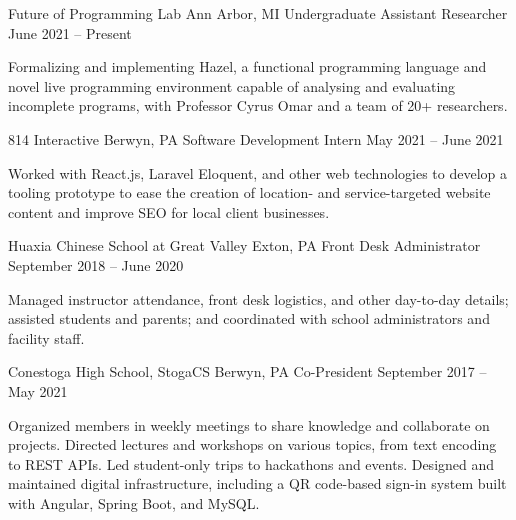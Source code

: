 \documentclass[letterpaper,11pt]{article}
\begin{document}
  \begin{rsectionlist}
    \rsectionitem
      {Future of Programming Lab}
      {Ann Arbor, MI}
      {Undergraduate Assistant Researcher}
      {June 2021 -- Present}
      
      Formalizing and implementing Hazel, a functional programming language and novel live
      programming environment capable of analysing and evaluating incomplete programs, with
      Professor Cyrus Omar and a team of 20+ researchers.

      \begin{rpointlist}
      \end{rpointlist}

    \rsectionitem
      {814 Interactive}
      {Berwyn, PA}
      {Software Development Intern}
      {May 2021 -- June 2021}

      Worked with React.js, Laravel Eloquent, and other web technologies to develop a tooling
      prototype to ease the creation of location- and service-targeted website content and improve
      SEO for local client businesses.

    \rsectionitem
      {Huaxia Chinese School at Great Valley}
      {Exton, PA}
      {Front Desk Administrator}
      {September 2018 -- June 2020}

      Managed instructor attendance, front desk logistics, and other day-to-day details; assisted
      students and parents; and coordinated with school administrators and facility staff.

    \rsectionitem
      {Conestoga High School, StogaCS}
      {Berwyn, PA}
      {Co-President}
      {September 2017 -- May 2021}

      Organized members in weekly meetings to share knowledge and collaborate on projects. Directed
      lectures and workshops on various topics, from text encoding to REST APIs. Led student-only
      trips to hackathons and events. Designed and maintained digital infrastructure, including a QR
      code-based sign-in system built with Angular, Spring Boot, and MySQL.
  \end{rsectionlist}
\end{document}

